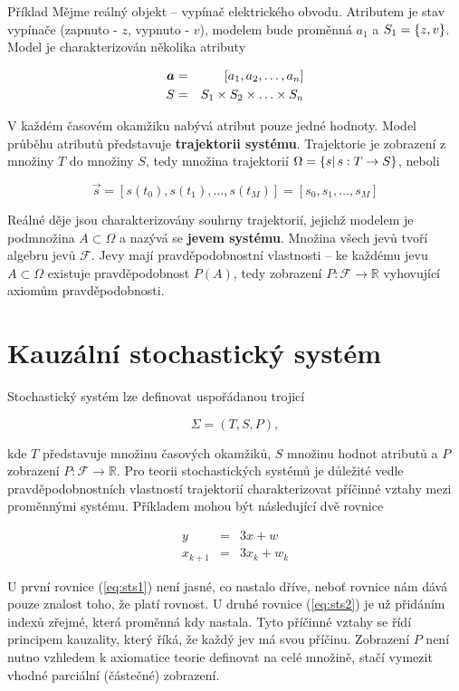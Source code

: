 \begin{note}{Příklad}
Mějme reálný objekt -- vypínač elektrického obvodu. Atributem je stav vypínače (zapnuto - $z$, vypnuto - $v$), modelem bude proměnná $a_1$ a $S_1=\brs{z,v}$. Model je charakterizován několika atributy

\begin{eqnarray*}
\vec{a} & = & [\vecrow[a]]\\
S & = & S_1\times S_2 \times \ldots \times S_n
\end{eqnarray*}

V každém časovém okamžiku nabývá atribut pouze jedné hodnoty. Model průběhu atributů představuje \textbf{trajektorii systému}. Trajektorie je zobrazení z množiny $T$ do množiny $S$, tedy množina trajektorií $\Omega = \brs{s | \, s:T\to S}$, neboli

\[ \vec{s} = [s(t_0), s(t_1), \ldots, s(t_M)]=[s_0,s_1,\ldots, s_M] \]

Reálné děje jsou charakterizovány souhrny trajektorií, jejichž modelem je podmnožina $A\subset\Omega$ a nazývá se \textbf{jevem systému}. Množina všech jevů tvoří algebru jevů $\mathscr{F}$. Jevy mají pravděpodobnostní vlastnosti -- ke každému jevu $A\subset \Omega$ existuje pravděpodobnost $P(A)$, tedy zobrazení $P:\mathscr{F}\to\mathbb{R}$ vyhovující axiomům pravděpodobnosti.
\end{note}

\section{Kauzální stochastický systém}
Stochastický systém lze definovat uspořádanou trojicí

\[ \Sigma = (T,S,P), \]

kde $T$ představuje množinu časových okamžiků, $S$ množinu hodnot atributů a $P$ zobrazení $P:\mathscr{F}\to\mathbb{R}$. Pro teorii stochastických systémů je důležité vedle pravděpodobnostních vlastností trajektorií charakterizovat příčinné vztahy mezi proměnnými systému. Příkladem mohou být následující dvě rovnice

\begin{eqnarray}
y & = & 3x + w\label{eq:sts1}\\
x_{k+1} & = & 3x_k + w_k\label{eq:sts2}
\end{eqnarray}

U první rovnice (\ref{eq:sts1}) není jasné, co nastalo dříve, neboť rovnice nám dává pouze znalost toho, že platí rovnost. U druhé rovnice (\ref{eq:sts2}) je už přidáním indexů zřejmé, která proměnná kdy nastala. Tyto příčinné vztahy se řídí principem kauzality, který říká, že každý jev má svou příčinu. Zobrazení $P$ není nutno vzhledem k axiomatice teorie definovat na celé množině, stačí vymezit vhodné parciální (částečné) zobrazení.

